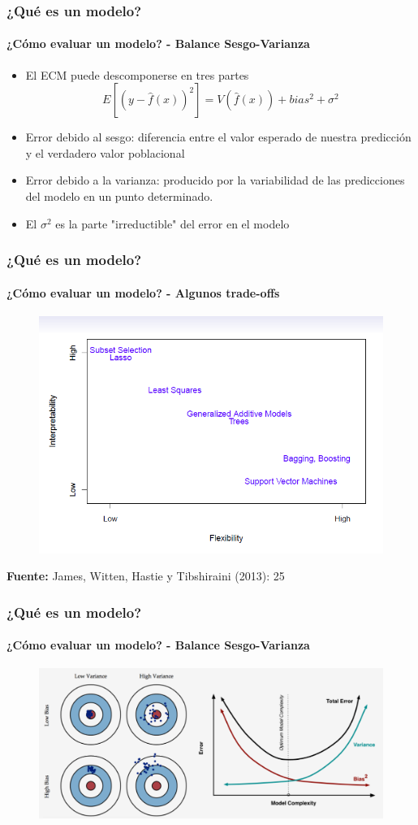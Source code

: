 \documentclass{beamer}
\begin{document}
\begin{frame}
	\frametitle{¿Qué es un modelo?}
	\framesubtitle{¿Cómo evaluar un modelo? - Balance Sesgo-Varianza}
	\begin{itemize}
		\item{El ECM puede descomponerse en tres partes}
		\begin{equation}
		E[(y - \hat{f}(x))^2]=V(\hat{f}(x)) + bias^2 +\sigma^2
		\end{equation}	
		\item{Error debido al sesgo: diferencia entre el valor esperado de nuestra predicción y el verdadero valor poblacional}
		\item{Error debido a la varianza: producido por la variabilidad de las predicciones del modelo en un punto determinado.}
		\item{El $\sigma^2$ es la parte "irreductible" del error en el modelo}
	\end{itemize}
\end{frame}

\begin{frame}
	\frametitle{¿Qué es un modelo?}
	\framesubtitle{¿Cómo evaluar un modelo? - Algunos trade-offs}
	\begin{figure}
		\centering
		\includegraphics[width=0.7\linewidth, height=0.7\textheight]{img/trade_offs}
	\end{figure}
	{\footnotesize\textbf{Fuente:} James, Witten, Hastie y Tibshiraini (2013): 25}
\end{frame}

\begin{frame}
	\frametitle{¿Qué es un modelo?}
	\framesubtitle{¿Cómo evaluar un modelo? - Balance Sesgo-Varianza}
	\begin{figure}
		\centering
		\includegraphics[width=0.8\linewidth, height=0.5\textheight]{img/bias_variance}
	\end{figure}
\end{frame}
\end{document}
